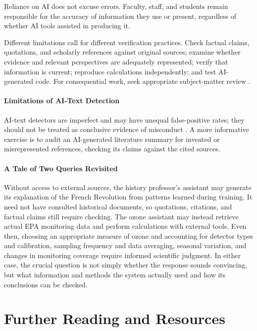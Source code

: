 \documentclass[11pt]{article}
\begin{document}
Reliance on AI does not excuse errors. Faculty, staff,
and students remain responsible for the accuracy of
information they use or present, regardless of whether
AI tools assisted in producing it.

Different limitations call for different verification practices.
Check factual claims, quotations, and scholarly references
against original sources; examine whether evidence and relevant
perspectives are adequately represented; verify that information
is current; reproduce calculations independently; and test
AI-generated code. For consequential work, seek appropriate
subject-matter review \citep{Ji2023Hallucination,Bender2021Parrots,NIST2024GenAI,Kasneci2023Education}.

\paragraph{Limitations of AI-Text Detection}
AI-text detectors are imperfect and may have unequal
false-positive rates; they should not be treated as
conclusive evidence of misconduct \citep{Liang2023Detectors}.
A more informative exercise is to audit an AI-generated
literature summary for invented or misrepresented references,
checking its claims against the cited sources.

\paragraph{A Tale of Two Queries Revisited}

Without access to external sources, the history professor's
assistant may generate its explanation of the French Revolution
from patterns learned during training. It need not have consulted
historical documents, so quotations, citations, and factual
claims still require checking.
The ozone assistant may instead
retrieve actual EPA monitoring data and perform calculations
with external tools. Even then, choosing an appropriate measure of ozone and accounting for detector types and calibration, sampling frequency and data averaging, seasonal variation, and changes in monitoring coverage require informed scientific judgment.
In either case, the crucial question is not simply whether
the response sounds convincing, but what information and methods
the system actually used and how its conclusions can be checked.

\section{Further Reading and Resources}
\end{document}
